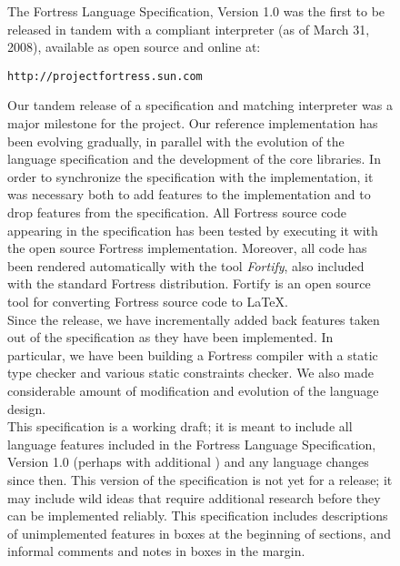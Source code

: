 \begin{figure}[p]
The Fortress Language Specification, Version 1.0\cite{Fortress} was the first to be
released in tandem with a compliant interpreter (as of March 31, 2008),
available as open source and online at:\\

\begin{center}
{\tt http://projectfortress.sun.com}\\[1em]
\end{center}
Our tandem release of a specification and matching interpreter was a major
milestone for the project.
Our reference implementation has been evolving gradually,
in parallel with the evolution of the language specification and
the development of the core libraries.  In order to synchronize
the specification with the implementation, it was necessary both to add
features to the implementation and to drop features from the specification.
All Fortress source code appearing in the specification has been
tested by executing it with the open source Fortress implementation. Moreover,
all code has been rendered automatically with the tool \emph{Fortify}, also
included with the standard Fortress distribution. Fortify is an open source tool
for converting Fortress source code to \LaTeX.\\


Since the release, we have incrementally added back
features taken out of the specification as they have been implemented.
In particular, we have been building a Fortress compiler with a static
type checker and various static constraints checker.
We also made considerable amount of modification and evolution of the
language design.\\


This specification is a working draft;
it is meant to include all language features included in
the Fortress Language Specification, Version 1.0\EXP{\beta{}}
(perhaps with additional ) and any language changes since then.
This version of the specification is not yet for a release;
it may include wild ideas that require additional research before they can be
implemented reliably.
This specification includes descriptions of unimplemented features in boxes
at the beginning of sections,
and informal comments and notes in boxes in the margin.





\end{figure}
